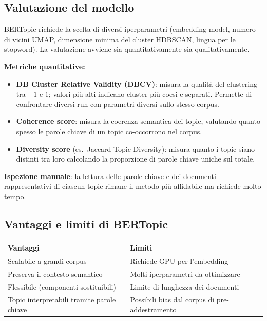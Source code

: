 \documentclass[12pt,a4paper]{article}
\begin{document}
\subsection{Valutazione del modello}

BERTopic richiede la scelta di diversi iperparametri (embedding model, numero di vicini
UMAP, dimensione minima del cluster HDBSCAN, lingua per le stopword). La valutazione avviene
sia quantitativamente sia qualitativamente.

\textbf{Metriche quantitative:}
\begin{itemize}
  \item \textbf{DB Cluster Relative Validity (DBCV)}: misura la qualità del clustering
        tra $-1$ e $1$; valori più alti indicano cluster più coesi e separati. Permette
        di confrontare diversi run con parametri diversi sullo stesso corpus.
  \item \textbf{Coherence score}: misura la coerenza semantica dei topic, valutando quanto
        spesso le parole chiave di un topic co-occorrono nel corpus.
  \item \textbf{Diversity score} (es.\ Jaccard Topic Diversity): misura quanto i topic siano
        distinti tra loro calcolando la proporzione di parole chiave uniche sul totale.
\end{itemize}

\textbf{Ispezione manuale}: la lettura delle parole chiave e dei documenti rappresentativi
di ciascun topic rimane il metodo più affidabile ma richiede molto tempo.

\subsection{Vantaggi e limiti di BERTopic}

\begin{center}
\begin{tabular}{p{}p{}}
\toprule
\textbf{Vantaggi} & \textbf{Limiti} \\
\midrule
Scalabile a grandi corpus & Richiede GPU per l'embedding \\
Preserva il contesto semantico & Molti iperparametri da ottimizzare \\
Flessibile (componenti sostituibili) & Limite di lunghezza dei documenti \\
Topic interpretabili tramite parole chiave & Possibili bias dal corpus di pre-addestramento \\
\bottomrule
\end{tabular}
\end{center}
\end{document}
